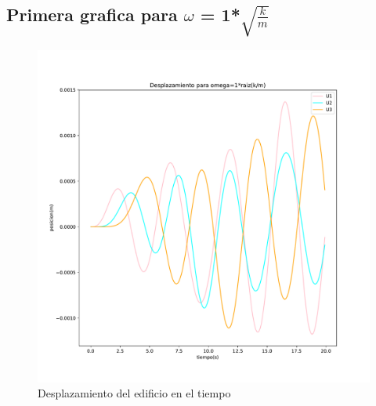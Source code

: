 \documentclass[11pt,letterpaper]{exam}
\begin{document}
\subsection{Primera grafica para $\omega$ = 1*$\sqrt{\frac{k}{m}}$}
\begin{figure}[H]
    \centering
    \includegraphics[width=1.1\textwidth]{plot_omegafijo.pdf}
    \caption{Desplazamiento del edificio en el tiempo}
    \label{fig:my_label}
\end{figure}
\end{document}
